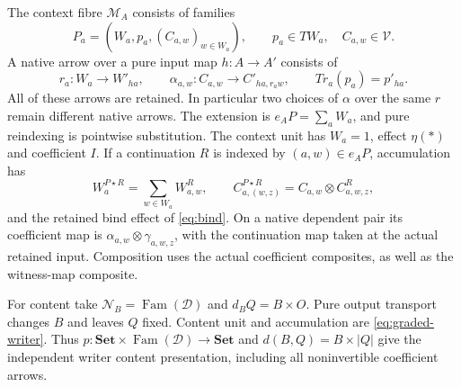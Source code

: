 \documentclass[11pt]{article}
\newcommand{\Set}{\mathbf{Set}}
\begin{document}
The context fibre $\mathcal M_A$ consists of families
\[
 P_a=(W_a,p_a,(C_{a,w})_{w\in W_a}),\qquad p_a\in TW_a,\quad C_{a,w}\in\mathcal V.
\]
A native arrow over a pure input map $h:A\to A'$ consists of
\[
 r_a:W_a\to W'_{ha},\qquad
 \alpha_{a,w}:C_{a,w}\to C'_{ha,r_aw},\qquad
 Tr_a(p_a)=p'_{ha}. \tag{G}\label{eq:graded-context-map}
\]
All of these arrows are retained. In particular two choices of $\alpha$ over the same $r$ remain different native arrows. The extension is $e_AP=\sum_aW_a$, and pure reindexing is pointwise substitution. The context unit has $W_a=1$, effect $\eta(*)$ and coefficient $I$. If a continuation $R$ is indexed by $(a,w)\in e_AP$, accumulation has
\[
 W^{P\star R}_a=\sum_{w\in W_a}W^R_{a,w},\qquad
 C^{P\star R}_{a,(w,z)}=C_{a,w}\otimes C^R_{a,w,z},
\tag{GA}\label{eq:graded-accumulation}
\]
and the retained bind effect of \eqref{eq:bind}. On a native dependent pair its coefficient map is $\alpha_{a,w}\otimes\gamma_{a,w,z}$, with the continuation map taken at the actual retained input. Composition uses the actual coefficient composites, as well as the witness-map composite.

For content take $\mathcal N_B=\operatorname{Fam}(\mathcal D)$ and $d_BQ=B\times O$. Pure output transport changes $B$ and leaves $Q$ fixed. Content unit and accumulation are \eqref{eq:graded-writer}. Thus $p:\Set\times\operatorname{Fam}(\mathcal D)\to\Set$ and $d(B,Q)=B\times|Q|$ give the independent writer content presentation, including all noninvertible coefficient arrows.
\end{document}
